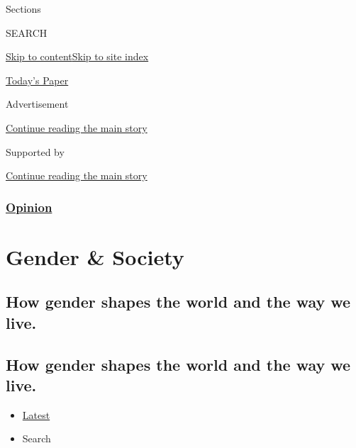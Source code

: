 Sections

SEARCH

\protect\hyperlink{site-content}{Skip to
content}\protect\hyperlink{site-index}{Skip to site index}

\href{https://myaccount.nytimes3xbfgragh.onion/auth/login?response_type=cookie\&client_id=vi}{}

\href{https://www.nytimes3xbfgragh.onion/section/todayspaper}{Today's
Paper}

Advertisement

\protect\hyperlink{after-top}{Continue reading the main story}

Supported by

\protect\hyperlink{after-sponsor}{Continue reading the main story}

\hypertarget{opinion}{%
\subsubsection{\texorpdfstring{\href{/section/opinion}{Opinion}}{Opinion}}\label{opinion}}

\hypertarget{gender--society}{%
\section{Gender \& Society}\label{gender--society}}

\hypertarget{how-gender-shapes-the-world-and-the-way-we-live}{%
\subsection{How gender shapes the world and the way we
live.}\label{how-gender-shapes-the-world-and-the-way-we-live}}

\hypertarget{how-gender-shapes-the-world-and-the-way-we-live-1}{%
\subsection{How gender shapes the world and the way we
live.}\label{how-gender-shapes-the-world-and-the-way-we-live-1}}

\begin{itemize}
\tightlist
\item
  \protect\hyperlink{stream-panel}{Latest}
\item
  Search
\end{itemize}

